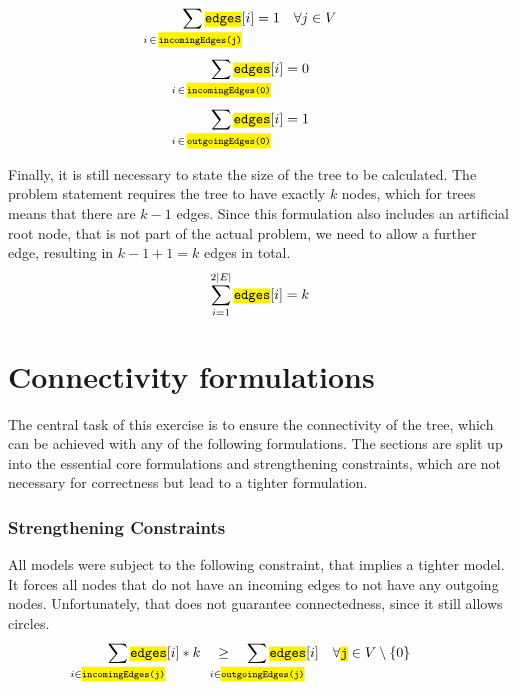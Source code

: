 \documentclass[,%
			paper=a4,%
			DIV14,
			liststotoc,
			bibtotoc,
			draft=false,%
			numbers=noendperiod
			]{scrartcl}
\newcommand{\ilc}[1]{\hl{\texttt{#1}}} %
\begin{document}
\begin{equation}\label{eq:oneIncoming}
	\sum_{\mathclap{i\,\in\,\ilc{incomingEdges(j)}}} \ilc{edges}[i] = 1 \quad \forall j \in V
\end{equation}
\begin{equation}\label{eq:root0}
	\sum_{\mathclap{i\,\in\,\ilc{incomingEdges(0)}}} \ilc{edges}[i] = 0
\end{equation}
\begin{equation}\label{eq:root1}
	\sum_{\mathclap{i\,\in\,\ilc{outgoingEdges(0)}}} \ilc{edges}[i] = 1 
\end{equation}

Finally, it is still necessary to state the size of the tree to be calculated.
The problem statement requires the tree to have exactly $k$ nodes, which for trees means that there are $k-1$ edges.
Since this formulation also includes an artificial root node, that is not part of the actual problem, we need to allow a further edge, resulting in $k-1+1=k$ edges in total.
\begin{equation}
	\sum_{i=1}^{2|E|} \ilc{edges}[i] = k
\end{equation}

\section{Connectivity formulations}

The central task of this exercise is to ensure the connectivity of the tree, which can be achieved with any of the following formulations.
The sections are split up into the essential core formulations and strengthening constraints, which are not necessary for correctness but lead to a tighter formulation.

\subsubsection{Strengthening Constraints}
All models were subject to the following constraint, that implies a tighter model. It forces all nodes that do not have an incoming edges to not have any outgoing nodes. Unfortunately, that does not guarantee connectedness, since it still allows circles.
\begin{equation}\label{eq:StrAll}
	\sum_{\mathclap{i \in \ilc{incomingEdges(j)}}} \ilc{edges}[i] * k
 \quad \geq \quad
	\sum_{\mathclap{i \in \ilc{outgoingEdges(j)}}} \ilc{edges}[i]
\quad \forall \ilc{j} \in V \setminus \{0\}
\end{equation}
\end{document}
